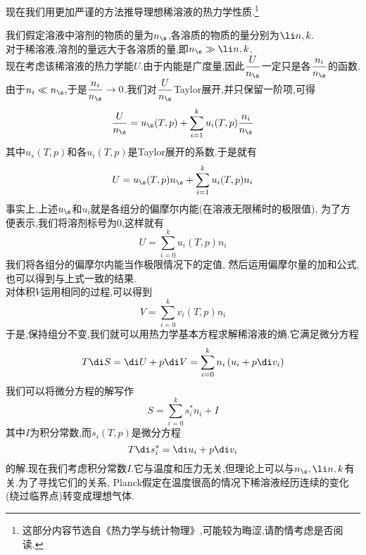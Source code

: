 \documentclass{ctexart}
\begin{document}
\indent 现在我们用更加严谨的方法推导理想稀溶液的热力学性质.\footnote{这部分内容节选自《热力学与统计物理》,可能较为晦涩,请酌情考虑是否阅读.}
\begin{derivation}\setcounter{equation}{0}
    我们假定溶液中溶剂的物质的量为$n_\s$,各溶质的物质的量分别为$\li n,k$.\\
    对于稀溶液,溶剂的量远大于各溶质的量,即$n_\s\gg\li n,k$.\\
    现在考虑该稀溶液的热力学能$U$.由于内能是广度量,因此$\dfrac{U}{n_\s}$一定只是各$\dfrac{n_i}{n_\s}$的函数.\\
    由于$n_i\ll n_\s$,于是$\dfrac{n_i}{n_\s}\to0$.我们对$\dfrac{U}{n_\s}$Taylor展开,并只保留一阶项,可得
    \begin{equation}
        \dfrac{U}{n_\s}=u_\s(T,p)+\sum_{i=1}^{k}u_i(T,p)\dfrac{n_i}{n_\s}
    \end{equation}
    其中$u_s(T,p)$和各$u_i(T,p)$是Taylor展开的系数.于是就有
    \begin{equation}
        U=u_\s(T,p)n_\s+\sum_{i=1}^{k}u_i(T,p)n_i
    \end{equation}
    事实上,上述$u_\s$和$u_i$就是各组分的偏摩尔内能(在溶液无限稀时的极限值).%
    为了方便表示,我们将溶剂标号为$0$,这样就有
    \begin{equation}
        U=\sum_{i=0}^{k}u_i(T,p)n_i
    \end{equation}
    我们将各组分的偏摩尔内能当作极限情况下的定值,%
    然后运用偏摩尔量的加和公式,也可以得到与上式一致的结果.\\
    对体积$V$运用相同的过程,可以得到
    \begin{equation}
        V=\sum_{i=0}^{k}v_i(T,p)n_i
    \end{equation}
    于是,保持组分不变,我们就可以用热力学基本方程求解稀溶液的熵.它满足微分方程
    \begin{equation}
        T\di S=\di U+p\di V=\sum_{i=0}^{k}n_i\left(u_i+p\di v_i\right)
    \end{equation}
    我们可以将微分方程的解写作
    \begin{equation}
        S=\sum_{i=0}^{k}s_i^\ast n_i+I
    \end{equation}
    其中$I$为积分常数,而$s_i(T,p)$是微分方程
    \begin{equation}
        T\di s_i^\ast=\di u_i+p\di v_i
    \end{equation}
    的解.现在我们考虑积分常数$I$.它与温度和压力无关,但理论上可以与$n_\s,\li n,k$有关.为了寻找它们的关系,%
    Planck假定在温度很高的情况下稀溶液经历连续的变化(绕过临界点)转变成理想气体.%

\end{derivation}
\end{document}
